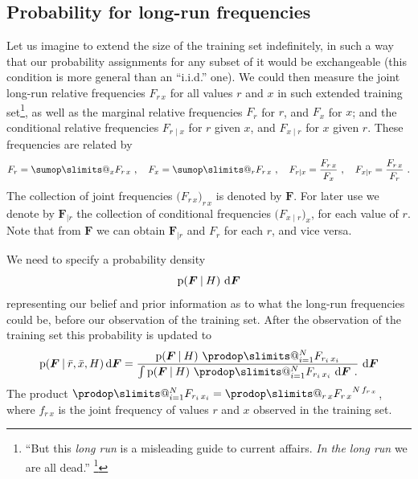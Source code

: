 \documentclass[\ifafour a4paper,12pt,\else a5paper,10pt,\fi%
onecolumn,oneside,article,%
british%
]{memoir}
\makeatletter
\theoremstyle{remark}
\theoremstyle{innote}
\def\sum{\DOTSI\sumop\slimits@}
\def\prod{\DOTSI\prodop\slimits@}
\newcommand*{\citep}{\footcites}
\newcommand*{\di}{\mathrm{d}}%
\newcommand*{\p}{\mathrm{p}}%
\renewcommand*{\|}[1][]{\nonscript\:#1\vert\nonscript\:\mathopen{}}
\renewcommand*{\=}{\TextOrMath\texteq\eq}
\newcommand*{\sect}{\S}%
\newcommand*{\q}{}%
\DeclareRobustCommand*{\q}{%
  \mathord{\mathpalette\bigcdot@{}}%
}
\newcommand*{\bigcdot@scalefactor}{0.7}
\newcommand*{\bigcdot@widthfactor}{1.5}
\newcommand*{\bigcdot@}[2]{%
  \sbox0{$#1\vcenter{}$}%
  \sbox2{$#1\cdot\m@th$}%
  \hbox to \bigcdot@widthfactor\wd2{%
    \hfil
    \raise\ht0\hbox{%
      \scalebox{\bigcdot@scalefactor}{%
        \lower\ht0\hbox{$#1\bullet\m@th$}%
      }%
    }%
    \hfil
  }%
}
\newcommand*{\rd}{\bar{r}}
\newcommand*{\xd}{\bar{x}}
\newcommand*{\yF}{\bm{F}}
\newcommand*{\yFr}{\yF_{\bm{\mid}r}}
\makeatother
\begin{document}
\subsection{Probability for long-run frequencies}
\label{sec:prob_longrun}

Let us imagine to extend the size of the training set indefinitely, in such
a way that our probability assignments for any subset of it would be
exchangeable (this condition is more general than an \enquote{i.i.d.} one).
We could then measure the joint long-run relative frequencies $F_{r\,x}$
for all values $r$ and $x$ in such extended training
set\footnote{\enquote{But this \emph{long run} is a misleading guide to
    current affairs. \emph{In the long run} we are all dead.}
  \citep[\sect~3.I, p.~65]{keynes1923_r2013}}, as well as the marginal
relative frequencies $F_{r\q}$ for $r$, and $F_{\q x}$ for $x$; and the
conditional relative frequencies $F_{r\mid x}$ for $r$ given $x$, and
$F_{x \mid r}$ for $x$ given $r$. These frequencies are related by
\begin{equation}
  \label{eq:frequencies_relations}
  F_{r\q}=\sum_{x} F_{r\,x}\ , \quad
  F_{\q x}=\sum_{r} F_{r\,x}\ ,\quad
  F_{r\mid x}=\frac{F_{r\,x}}{F_{\q x}}\ , \quad
  F_{x\mid r}=\frac{F_{r\,x}}{F_{r\q}}\ .
\end{equation}
The collection of joint frequencies $\bigl(F_{r\,x}\bigr)_{r\,x}$ is
denoted by $\yF$. For later use we denote by $\yFr$ the collection of
conditional frequencies $\bigl(F_{x\mid r}\bigr)_{x}$, for each value of
$r$. Note that from $\yF$ we can obtain $\yFr$ and $F_{r\q}$ for each $r$,
and vice versa.

\medskip

We need to specify a probability density
\begin{equation}\label{eq:prior_F}
\p(\yF \| H)\ \di\yF
\end{equation}
representing our belief and prior information as to what the long-run
frequencies could be, before our observation of the training set. After the
observation of the training set this probability is updated to
\begin{equation}
  \label{eq:post_prob_F}
  \p(\yF\|\rd,\xd, H)\,\di\yF =
  \frac{\p(\yF\| H)\
    \prod_{i=1}^{N} F_{r_{i}\,x_{i}}
  }{\int \p(\yF\| H)\
    \prod_{i=1}^{N} F_{r_{i}\,x_{i}}
              \ \di\yF \ .
  }\ \di\yF
\end{equation}
The product $\prod_{i=1}^{N} F_{r_{i}\,x_{i}} = \prod_{r\,x} {F_{r\,x}}^{N\, f_{r\,x}}$,
where $f_{r\,x}$ is the joint frequency of values $r$ and $x$ observed in
the training set.
\end{document}

